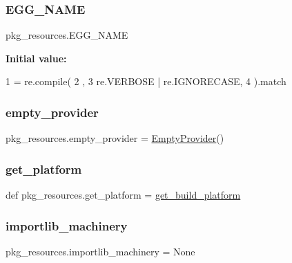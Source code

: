 \subsubsection{\texorpdfstring{E\+G\+G\+\_\+\+N\+A\+ME}{EGG\_NAME}}
{\footnotesize\ttfamily pkg\+\_\+resources.\+E\+G\+G\+\_\+\+N\+A\+ME}

{\bfseries Initial value\+:}
\begin{DoxyCode}
1 =  re.compile(
2     ,
3     re.VERBOSE | re.IGNORECASE,
4 ).match
\end{DoxyCode}
\mbox{\label{namespacepkg__resources_ad4a5f62f100fdb128f15480d4fd2f007}} 
\subsubsection{\texorpdfstring{empty\+\_\+provider}{empty\_provider}}
{\footnotesize\ttfamily pkg\+\_\+resources.\+empty\+\_\+provider = \hyperlink{classpkg__resources_1_1_empty_provider}{Empty\+Provider}()}

\mbox{\label{namespacepkg__resources_a2afbdfa7252b3903db74ac7b3d22e922}} 
\subsubsection{\texorpdfstring{get\+\_\+platform}{get\_platform}}
{\footnotesize\ttfamily def pkg\+\_\+resources.\+get\+\_\+platform = \hyperlink{namespacepkg__resources_a428a5468ed29d9fc3a2c9c7b3c69d4d8}{get\+\_\+build\+\_\+platform}}

\mbox{\label{namespacepkg__resources_a66b38c27156e4bfec03efd41393cdbe1}} 
\subsubsection{\texorpdfstring{importlib\+\_\+machinery}{importlib\_machinery}}
{\footnotesize\ttfamily pkg\+\_\+resources.\+importlib\+\_\+machinery = None}

